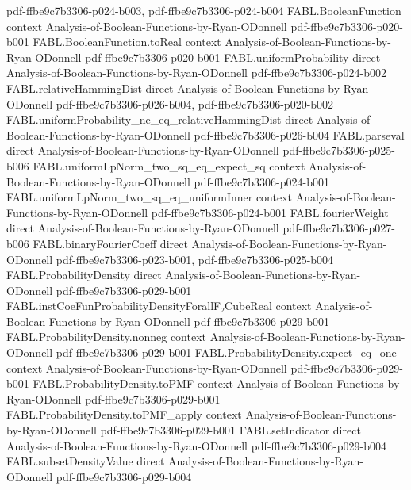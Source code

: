 \begin{theorem}
  {pdf-ffbe9c7b3306-p024-b003,
    pdf-ffbe9c7b3306-p024-b004}
\proofstep
  {FABL.BooleanFunction}
  {context}
  {Analysis-of-Boolean-Functions-by-Ryan-ODonnell}
  {pdf-ffbe9c7b3306-p020-b001}
\proofstep
  {FABL.BooleanFunction.toReal}
  {context}
  {Analysis-of-Boolean-Functions-by-Ryan-ODonnell}
  {pdf-ffbe9c7b3306-p020-b001}
\proofstep
  {FABL.uniformProbability}
  {direct}
  {Analysis-of-Boolean-Functions-by-Ryan-ODonnell}
  {pdf-ffbe9c7b3306-p024-b002}
\proofstep
  {FABL.relativeHammingDist}
  {direct}
  {Analysis-of-Boolean-Functions-by-Ryan-ODonnell}
  {pdf-ffbe9c7b3306-p026-b004,
    pdf-ffbe9c7b3306-p020-b002}
\proofstep
  {FABL.uniformProbability_ne_eq_relativeHammingDist}
  {direct}
  {Analysis-of-Boolean-Functions-by-Ryan-ODonnell}
  {pdf-ffbe9c7b3306-p026-b004}
\proofstep
  {FABL.parseval}
  {direct}
  {Analysis-of-Boolean-Functions-by-Ryan-ODonnell}
  {pdf-ffbe9c7b3306-p025-b006}
\proofstep
  {FABL.uniformLpNorm_two_sq_eq_expect_sq}
  {context}
  {Analysis-of-Boolean-Functions-by-Ryan-ODonnell}
  {pdf-ffbe9c7b3306-p024-b001}
\proofstep
  {FABL.uniformLpNorm_two_sq_eq_uniformInner}
  {context}
  {Analysis-of-Boolean-Functions-by-Ryan-ODonnell}
  {pdf-ffbe9c7b3306-p024-b001}
\proofstep
  {FABL.fourierWeight}
  {direct}
  {Analysis-of-Boolean-Functions-by-Ryan-ODonnell}
  {pdf-ffbe9c7b3306-p027-b006}
\proofstep
  {FABL.binaryFourierCoeff}
  {direct}
  {Analysis-of-Boolean-Functions-by-Ryan-ODonnell}
  {pdf-ffbe9c7b3306-p023-b001,
    pdf-ffbe9c7b3306-p025-b004}
\proofstep
  {FABL.ProbabilityDensity}
  {direct}
  {Analysis-of-Boolean-Functions-by-Ryan-ODonnell}
  {pdf-ffbe9c7b3306-p029-b001}
\proofstep
  {FABL.instCoeFunProbabilityDensityForallF₂CubeReal}
  {context}
  {Analysis-of-Boolean-Functions-by-Ryan-ODonnell}
  {pdf-ffbe9c7b3306-p029-b001}
\proofstep
  {FABL.ProbabilityDensity.nonneg}
  {context}
  {Analysis-of-Boolean-Functions-by-Ryan-ODonnell}
  {pdf-ffbe9c7b3306-p029-b001}
\proofstep
  {FABL.ProbabilityDensity.expect_eq_one}
  {context}
  {Analysis-of-Boolean-Functions-by-Ryan-ODonnell}
  {pdf-ffbe9c7b3306-p029-b001}
\proofstep
  {FABL.ProbabilityDensity.toPMF}
  {context}
  {Analysis-of-Boolean-Functions-by-Ryan-ODonnell}
  {pdf-ffbe9c7b3306-p029-b001}
\proofstep
  {FABL.ProbabilityDensity.toPMF_apply}
  {context}
  {Analysis-of-Boolean-Functions-by-Ryan-ODonnell}
  {pdf-ffbe9c7b3306-p029-b001}
\proofstep
  {FABL.setIndicator}
  {direct}
  {Analysis-of-Boolean-Functions-by-Ryan-ODonnell}
  {pdf-ffbe9c7b3306-p029-b004}
\proofstep
  {FABL.subsetDensityValue}
  {direct}
  {Analysis-of-Boolean-Functions-by-Ryan-ODonnell}
  {pdf-ffbe9c7b3306-p029-b004}

\end{theorem}
